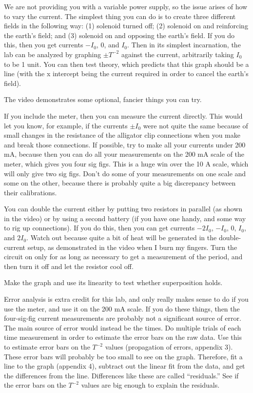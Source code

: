 \observations

We are not providing you with a variable power supply, so the issue arises of how to vary the current.
The simplest thing you can do is to create three different fields in the following way: (1) solenoid turned off;
(2) solenoid on and reinforcing the earth's field; and (3) solenoid on and opposing the earth's field.
If you do this, then you get currents $-I_0$, 0, and $I_0$. Then in its simplest incarnation,
the lab can be analyzed by graphing $\pm T^{-2}$ against the current, arbitrarily taking $I_0$ to be 1 unit. You can then test theory, which
predicts that this graph should be a line (with the x intercept being the current required in order to
cancel the earth's field).

The video demonstrates some optional, fancier things you can try.

If you include the meter, then you can measure
the current directly. This would let you know, for example, if the currents $\pm I_0$ were not quite the same
because of small changes in the resistance of the alligator clip connections when you make and break those connections.
If possible, try to make all your currents under 200 mA, because then you can do all your measurements on the 200 mA
scale of the meter, which gives you four sig figs. This is a huge win over the 10 A scale, which will only give two
sig figs. Don't do some of your measurements on one scale and some on the other, because there is probably quite a big
discrepancy between their calibrations.

You can double the current either by putting two resistors in parallel (as shown in the video) or by
using a second battery (if you have one handy, and some way to rig up connections). 
If you do this, then you can get currents $-2I_0$, $-I_0$, 0, $I_0$, and $2I_0$.
Watch out because
quite a bit of heat will be generated in the double-current setup, as demonstrated in the video when I
burn my fingers. Turn the circuit on only for as long as necessary to get a measurement of the period,
and then turn it off and let the resistor cool off.

\analysis

Make the graph and use its linearity to test whether superposition holds.

Error analysis is extra credit for this lab, and only really makes sense to do if you use the meter,
and use it on the 200 mA scale. If you do these things, then the four-sig-fig current measurements are
probably not a significant source of error. The main source of error would instead be the times.
Do multiple trials of each time measurement in order to estimate the error bars on the raw data.
Use this to estimate error bars on the $T^{-2}$ values (propagation of errors, appendix 3).
These error bars will probably be too small to see on the graph. Therefore, fit a line to the
graph (appendix 4), subtract out the linear fit from the data, and get the differences from the
line. Differences like these are called ``residuals.'' See if the error bars on the $T^{-2}$	values
are big enough to explain the residuals.

